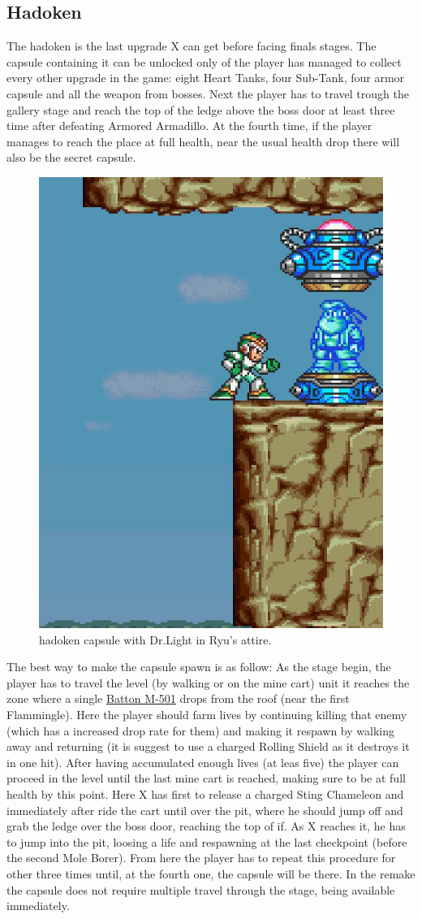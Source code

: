 \subsection{Hadoken}\label{hadoken}
The hadoken is the last upgrade X can get before facing finals stages. The capsule containing it can be unlocked only of the player has managed to collect every other upgrade in the game: eight Heart Tanks, four Sub-Tank, four armor capsule and all the weapon from bosses. Next the player has to travel trough the gallery stage and reach the top of the ledge above the boss door at least three time after defeating Armored Armadillo. At the fourth time, if the player manages to reach the place at full health, near the usual health drop there will also be the secret capsule.
\begin{figure}[htp]
	\centering
	\includegraphics[width=0.3\linewidth]{figures/X1/Armored_armadillo/Armadillo_hadoken.jpg}
	\caption{hadoken capsule with Dr.Light in Ryu's attire.}
\end{figure}
The best way to make the capsule spawn is as follow: As the stage begin, the player has to travel the level (by walking or on the mine cart) unit it reaches the zone where a single \hyperlink{enem:Batton_M-501}{Batton M-501} drops from the roof (near the first Flammingle). Here the player should farm lives by continuing killing that enemy (which has a increased drop rate for them)  and making it respawn by walking away and returning (it is suggest to use a charged Rolling Shield as it destroys it in one hit). After having accumulated enough lives (at leas five) the player can proceed in the level until the last mine cart is reached, making sure to be at full health by this point. Here X has first to release a charged Sting Chameleon and immediately after ride the cart until over the pit, where he should jump off and grab the ledge over the boss door, reaching the top of if. As X reaches it, he has to jump into the pit, loosing a life and respawning at the last checkpoint (before the second Mole Borer). From here the player has to repeat this procedure for other three times until, at the  fourth one, the capsule will be there. In the remake the capsule does not require multiple travel through the stage, being available immediately.

